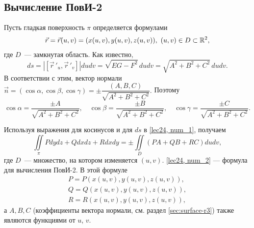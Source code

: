 \documentclass[../../main.tex]{subfiles}
\begin{document}
\subsection{Вычисление ПовИ-2}

Пусть гладкая поверхность $\pi$ определяется формулами \[\vec{r} = 
\vec{r}(u,v) 
=
 (x(u,v), y(u,v), z(u,v)),\ (u, v)\in D\subset \mathbb{R}^2,\] где $D$~--- замкнутая 
 область.
Как известно, \[ds = \left|\left[ \vec r\,'_u,  \vec r\,'_v\right]\right|dudv 
= 
\sqrt{EG - F^2}\,dudv = \sqrt{A^2 + B^2 + C^2}\,dudv.\] В соответствии с этим, 
вектор нормали
 $\vec{n} = (\cos\alpha, \cos\beta, \cos\gamma) = \pm\dfrac{(A, B, 
 C)}{\sqrt{A^2
 		 + B^2 + C^2}}.$ Поэтому \[\cos\alpha = \frac{\pm A}{\sqrt{A^2 + B^2 + 
 		 C^2}},\quad \cos\beta = \frac{\pm B}{\sqrt{A^2 + B^2 + C^2}},\quad 
 	 \cos\gamma = \frac{\pm C}{\sqrt{A^2 + B^2 + C^2}}.\]

Используя выражения для косинусов и для $ds$ в \eqref{lec24, num_1}, получаем
\begin{equation}\label{lec24, num_2}
\iint\limits_\pi Pdydz + Qdxdz + Rdxdy = \pm \iint\limits_D(PA + QB + RC)dudv,
\end{equation}
где $D$~--- множество, на котором изменяется $(u, v)$.
\eqref{lec24, num_2} --- формула для вычисления \mbox{ПовИ-2}. В этой формуле
\begin{gather*}
 P = P(x(u,v), y(u,v), z(u,v)), \\
 Q = Q(x(u,v), y(u,v), z(u,v)), \\
 R = R(x(u,v), y(u,v), z(u,v)),
\end{gather*}
а $A, B, C$ (коэффициенты вектора нормали, см. раздел \ref{sec:surface-r3}) 
также являются функциями от $u$, $v$.
\end{document}
